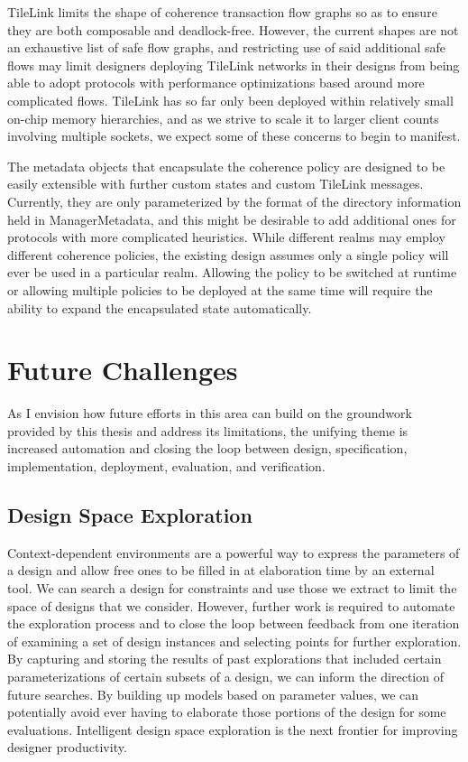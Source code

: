TileLink limits the shape of coherence transaction flow graphs so as to ensure they are both composable and deadlock-free.
However, the current shapes are not an exhaustive list of safe flow graphs,
and restricting use of said additional safe flows may limit designers deploying TileLink networks in their designs
from being able to adopt protocols with performance optimizations based around more complicated flows.
TileLink has so far only been deployed within relatively small on-chip memory hierarchies,
and as we strive to scale it to larger client counts involving multiple sockets,
 we expect some of these concerns to begin to manifest. 

The metadata objects that encapsulate the coherence policy are designed to be easily extensible with
further custom states and custom TileLink messages.
Currently, they are only parameterized by the format of the directory information held in ManagerMetadata,
and this might be desirable to add additional ones for protocols with more complicated heuristics.
While different realms may employ different coherence policies,
the existing design assumes only a single policy will ever be used in a particular realm.
Allowing the policy to be switched at runtime or allowing multiple policies to be deployed at the same time will require the ability to expand the encapsulated state automatically.

\section{Future Challenges}

As I envision how future efforts in this area can build on the groundwork provided by this thesis and address its limitations,
the unifying theme is increased automation and closing the loop between
design, specification, implementation, deployment, evaluation, and verification.

\subsection{Design Space Exploration}

Context-dependent environments are a powerful way to express the parameters of a design and allow free ones
to be filled in at elaboration time by an external tool.
We can search a design for constraints and use those we extract to limit the space of designs that we consider.
However, further work is required to automate the exploration process and 
to close the loop between feedback from one iteration of examining a
set of design instances and selecting points for further exploration.
By capturing and storing the results of past explorations that included certain parameterizations
of certain subsets of a design, we can inform the direction of future searches.
By building up models based on parameter values, we can potentially avoid ever having to elaborate those
portions of the design for some evaluations.
Intelligent design space exploration is the next frontier for improving designer productivity.

